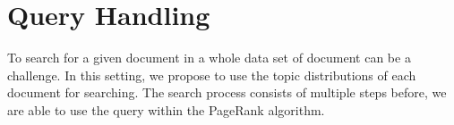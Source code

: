 \section{Query Handling}
To search for a given document in a whole data set of document can be a challenge. 
In this setting, we propose to use the topic distributions of each document for searching.
The search process consists of multiple steps before, we are able to use the query within the PageRank algorithm. 
 